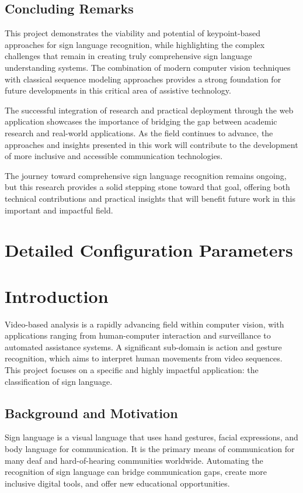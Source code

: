 \documentclass[11pt, a4paper]{article}
\begin{document}
\subsection{Concluding Remarks}

This project demonstrates the viability and potential of keypoint-based approaches for sign language recognition, while highlighting the complex challenges that remain in creating truly comprehensive sign language understanding systems. The combination of modern computer vision techniques with classical sequence modeling approaches provides a strong foundation for future developments in this critical area of assistive technology.

The successful integration of research and practical deployment through the web application showcases the importance of bridging the gap between academic research and real-world applications. As the field continues to advance, the approaches and insights presented in this work will contribute to the development of more inclusive and accessible communication technologies.

The journey toward comprehensive sign language recognition remains ongoing, but this research provides a solid stepping stone toward that goal, offering both technical contributions and practical insights that will benefit future work in this important and impactful field.

\appendix
\section{Detailed Configuration Parameters}


\section{Introduction}
Video-based analysis is a rapidly advancing field within computer vision, with applications ranging from human-computer interaction and surveillance to automated assistance systems. A significant sub-domain is action and gesture recognition, which aims to interpret human movements from video sequences. This project focuses on a specific and highly impactful application: the classification of sign language.

\subsection{Background and Motivation}
Sign language is a visual language that uses hand gestures, facial expressions, and body language for communication. It is the primary means of communication for many deaf and hard-of-hearing communities worldwide. Automating the recognition of sign language can bridge communication gaps, create more inclusive digital tools, and offer new educational opportunities.
\end{document}
